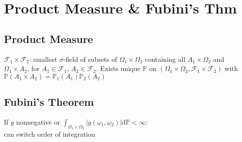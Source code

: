 \section{Product Measure \& Fubini's Thm}
	\subsection*{Product Measure}	
	$\mathcal{F}_{1}\times\mathcal{F}_{2}$: smallest $\sigma$-field of subsets of $\Omega_{1}\times\Omega_{2}$ containing all $A_{1}\times\Omega_{2}$ and $\Omega_{1}\times A_{2}$, for $A_{1}\in\mathcal{F}_{1}$, $A_{2}\in\mathcal{F}_{2}$.
	Exists unique $\mathbb{P}$ on $\left(\Omega_{1}\times\Omega_{2}, \mathcal{F}_{1}\times\mathcal{F}_{2}\right)$ with $\mathbb{P}\left(A_{1}\times A_{2}\right) = \mathbb{P}_{1}\left(A_{1}\right)\mathbb{P}_{2}\left(A_{2}\right)$
	
	\subsection*{Fubini's Theorem}
	If $g$ nonnegative or $\int_{\Omega_{1}\times\Omega_{2}}\!\left|g\left(\omega_{1},\omega_{2}\right)\right|\!\mathrm{d}\mathbb{P} < \infty$:\\
	can switch order of integration
	